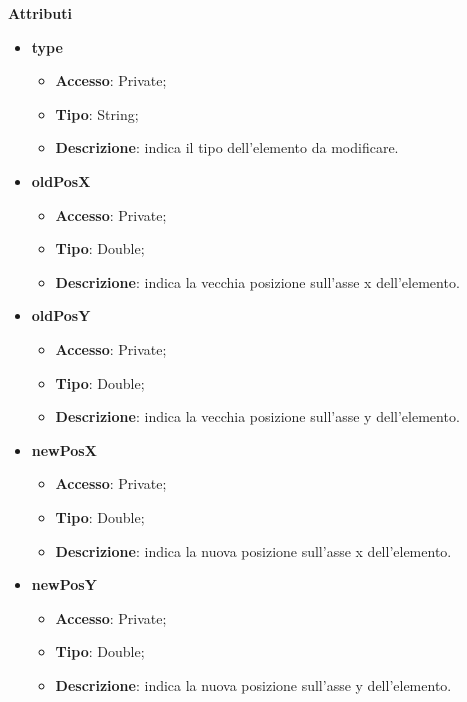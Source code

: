 {{{	\textbf{Attributi}
	\begin{itemize}
		\item \textbf{type}
		\begin{itemize}
			\item \textbf{Accesso}: Private;
			\item \textbf{Tipo}: String;
			\item \textbf{Descrizione}: indica il tipo dell’elemento da modificare.
		\end{itemize}
		\item \textbf{oldPosX}
		\begin{itemize}
			\item \textbf{Accesso}: Private;
			\item \textbf{Tipo}: Double;
			\item \textbf{Descrizione}: indica la vecchia posizione sull’asse x dell’elemento.
		\end{itemize}
		\item \textbf{oldPosY}
		\begin{itemize}
			\item \textbf{Accesso}: Private;
			\item \textbf{Tipo}: Double;
			\item \textbf{Descrizione}: indica la vecchia posizione sull’asse y dell’elemento.
		\end{itemize}
		\item \textbf{newPosX}
		\begin{itemize}
			\item \textbf{Accesso}: Private;
			\item \textbf{Tipo}: Double;
			\item \textbf{Descrizione}: indica la nuova posizione sull’asse x dell’elemento.
		\end{itemize}
		\item \textbf{newPosY}
		\begin{itemize}
			\item \textbf{Accesso}: Private;
			\item \textbf{Tipo}: Double;
			\item \textbf{Descrizione}: indica la nuova posizione sull’asse y dell’elemento.
		\end{itemize}
	\end{itemize}
	
}}}
